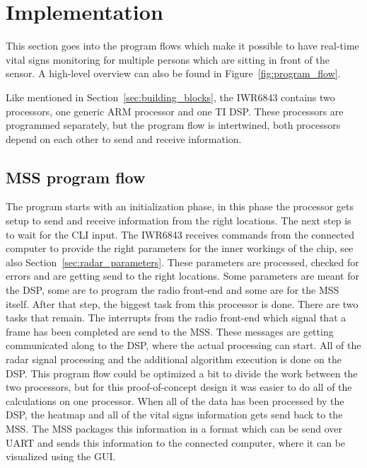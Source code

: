 \section{Implementation}
This section goes into the program flows which make it possible to have real-time vital signs monitoring for multiple persons which are sitting in front of the sensor. A high-level overview can also be found in Figure~\ref{fig:program_flow}.

Like mentioned in Section~\ref{sec:building_blocks}, the IWR6843 contains two processors, one generic ARM processor and one TI DSP. These processors are programmed separately, but the program flow is intertwined, both processors depend on each other to send and receive information. 

\subsection{MSS program flow}
The program starts with an initialization phase, in this phase the processor gets setup to send and receive information from the right locations. The next step is to wait for the CLI input. The IWR6843 receives commands from the connected computer to provide the right parameters for the inner workings of the chip, see also Section~\ref{sec:radar_parameters}. These parameters are processed, checked for errors and are getting send to the right locations. Some parameters are meant for the DSP, some are to program the radio front-end and some are for the MSS itself. After that step, the biggest task from this processor is done. There are two tasks that remain. The interrupts from the radio front-end which signal that a frame has been completed are send to the MSS. These messages are getting communicated along to the DSP, where the actual processing can start. All of the radar signal processing and the additional algorithm execution is done on the DSP. This program flow could be optimized a bit to divide the work between the two processors, but for this proof-of-concept design it was easier to do all of the calculations on one processor. When all of the data has been processed by the DSP, the heatmap and all of the vital signs information gets send back to the MSS. The MSS packages this information in a format which can be send over UART and sends this information to the connected computer, where it can be visualized using the GUI.

